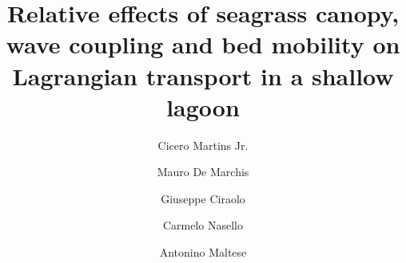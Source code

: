 \documentclass[review,12pt,authoryear]{elsarticle}
\begin{document}
\begin{frontmatter}

\title{Relative effects of seagrass canopy, wave coupling and bed mobility on
       Lagrangian transport in a shallow lagoon}

\author[unipa]{Cicero Martins Jr.}

\author[unipa]{Mauro De Marchis}
\author[unipa]{Giuseppe Ciraolo}
\author[unipa]{Carmelo Nasello}
\author[unipa]{Antonino Maltese}



\end{frontmatter}
\end{document}
